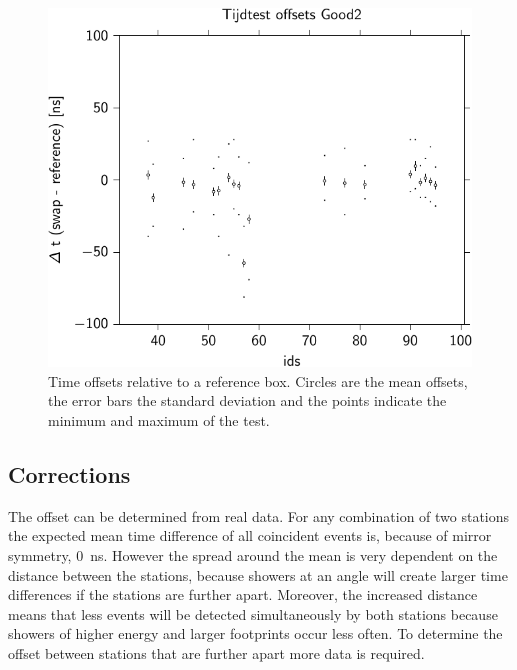 \begin{figure}
    \centering
    \includegraphics{plots/calibration/hisparc_offsets}
    \caption{Time offsets relative to a reference box. Circles are the
             mean offsets, the error bars the standard deviation and the
             points indicate the minimum and maximum of the test.}
    \label{fig:hisparc_offsets}
\end{figure}


\subsection{Corrections}

The offset can be determined from real data. For any combination of two
stations the expected mean time difference of all coincident events is,
because of mirror symmetry, \SI{0}{\nano\second}. However the spread
around the mean is very dependent on the distance between the stations,
because showers at an angle will create larger time differences if the
stations are further apart. Moreover, the increased distance means that
less events will be detected simultaneously by both stations because
showers of higher energy and larger footprints occur less often. To
determine the offset between stations that are further apart more data
is required.

